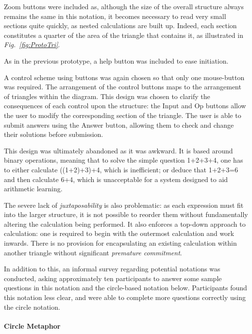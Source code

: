 \documentclass[12pt,twoside,notitlepage,xetex]{report}
\begin{document}
Zoom buttons were included as, although the size of the overall structure always remains the same in this notation, it becomes necessary to read very small sections quite quickly, as nested calculations are built up.  Indeed, each section constitutes a quarter of the area of the triangle that contains it, as illustrated in \emph{Fig.~\ref{fig:ProtoTri}}.

As in the previous prototype, a help button was included to ease initiation.

A control scheme using buttons was again chosen so that only one mouse-button was required.  The arrangement of the control buttons maps to the arrangement of triangles within the diagram.  This design was chosen to clarify the consequences of each control upon the structure: the {\sfapp Input} and {\sfapp Op} buttons allow the user to modify the corresponding section of the triangle.  The user is able to submit answers using the {\sfapp Answer} button, allowing them to check and change their solutions before submission.

This design was ultimately abandoned as it was awkward. It is based around binary operations, meaning that to solve the simple question 1+2+3+4, one has to either calculate ((1+2)+3)+4, which is inefficient; or deduce that 1+2+3=6 and then calculate 6+4, which is unacceptable for a system designed to aid arithmetic learning.

The severe lack of \emph{juxtaposability} is also problematic: as each expression must fit into the larger structure, it is not possible to reorder them without fundamentally altering the calculation being performed.  It also enforces a top-down approach to calculation: one is required to begin with the outermost calculation and work inwards.  There is no provision for encapsulating an existing calculation within another triangle without significant \emph{premature commitment}.

In addition to this, an informal survey regarding potential notations was conducted, asking approximately ten participants to answer some sample questions in this notation and the circle-based notation below.  Participants found this notation less clear, and were able to complete more questions correctly using the circle notation.


\paragraph{Circle Metaphor}\hfill
\end{document}
